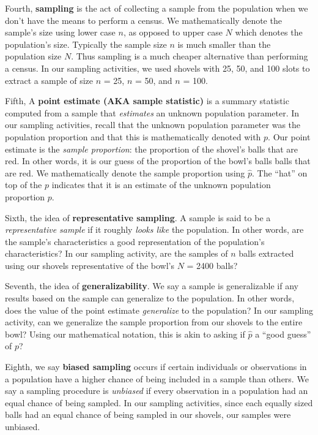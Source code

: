 \documentclass[
]{book}
\begin{document}
Fourth, \textbf{sampling} is the act of collecting a sample from the population when we don't have the means to perform a census. We mathematically denote the sample's size using lower case \(n\), as opposed to upper case \(N\) which denotes the population's size. Typically the sample size \(n\) is much smaller than the population size \(N\). Thus sampling is a much cheaper alternative than performing a census. In our sampling activities, we used shovels with 25, 50, and 100 slots to extract a sample of size \(n\) = 25, \(n\) = 50, and \(n\) = 100.

Fifth, A \textbf{point estimate (AKA sample statistic)} is a summary statistic computed from a sample that \emph{estimates} an unknown population parameter. In our sampling activities, recall that the unknown population parameter was the population proportion and that this is mathematically denoted with \(p\). Our point estimate is the \emph{sample proportion}: the proportion of the shovel's balls that are red. In other words, it is our guess of the proportion of the bowl's balls balls that are red. We mathematically denote the sample proportion using \(\widehat{p}\). The ``hat'' on top of the \(p\) indicates that it is an estimate of the unknown population proportion \(p\).

Sixth, the idea of \textbf{representative sampling}. A sample is said to be a \emph{representative sample} if it roughly \emph{looks like} the population. In other words, are the sample's characteristics a good representation of the population's characteristics? In our sampling activity, are the samples of \(n\) balls extracted using our shovels representative of the bowl's \(N\) = 2400 balls?

Seventh, the idea of \textbf{generalizability}. We say a sample is generalizable if any results based on the sample can generalize to the population. In other words, does the value of the point estimate \emph{generalize} to the population? In our sampling activity, can we generalize the sample proportion from our shovels to the entire bowl? Using our mathematical notation, this is akin to asking if \(\widehat{p}\) a ``good guess'' of \(p\)?

Eighth, we say \textbf{biased sampling} occurs if certain individuals or observations in a population have a higher chance of being included in a sample than others. We say a sampling procedure is \emph{unbiased} if every observation in a population had an equal chance of being sampled. In our sampling activities, since each equally sized balls had an equal chance of being sampled in our shovels, our samples were unbiased.
\end{document}
